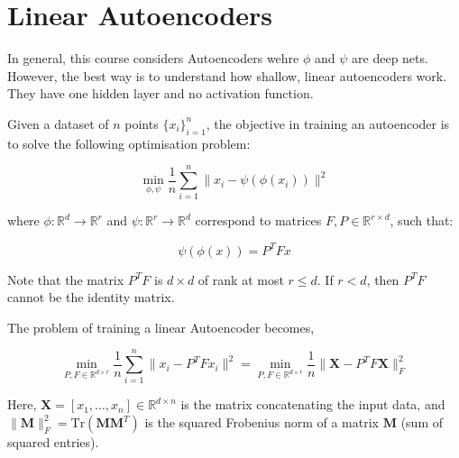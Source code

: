 \section{Linear Autoencoders}
In general, this course considers Autoencoders wehre $\phi$ and $\psi$ are deep nets. However, the best way is to understand how shallow, linear autoencoders work. They have one hidden layer and no activation function.

Given a dataset of \( n \) points \( \{x_i\}_{i=1}^n \), the objective in training an autoencoder is to solve the following optimisation problem:

\begin{equation}
    \min_{\phi, \psi} \frac{1}{n} \sum_{i=1}^{n} \|x_i - \psi(\phi(x_i))\|^2
\end{equation}

where \( \phi : \mathbb{R}^d \to \mathbb{R}^r \) and \( \psi : \mathbb{R}^r \to \mathbb{R}^d \) correspond to matrices \( F, P \in \mathbb{R}^{r \times d} \), such that:

\begin{equation}
    \psi(\phi(x)) = P^TFx
\end{equation}



Note that the matrix \( P^TF \) is \( d \times d \) of rank at most \( r \leq d \). If \( r < d \), then \( P^TF \) cannot be the identity matrix.

The problem of training a linear Autoencoder becomes,

\begin{equation}
    \min_{P, F \in \mathbb{R}^{d \times r}} \frac{1}{n} \sum_{i=1}^{n} \|x_i - P^T Fx_i\|^2 = \min_{P, F \in \mathbb{R}^{d \times r}} \frac{1}{n} \|\mathbf{X} - P^T F\mathbf{X}\|_F^2
\end{equation}

Here, \( \mathbf{X} = [x_1, \ldots, x_n] \in \mathbb{R}^{d \times n} \) is the matrix concatenating the input data, and \( \|\mathbf{M}\|_F^2 = \text{Tr}(\mathbf{MM}^T) \) is the squared Frobenius norm of a matrix \( \mathbf{M} \) (sum of squared entries).


